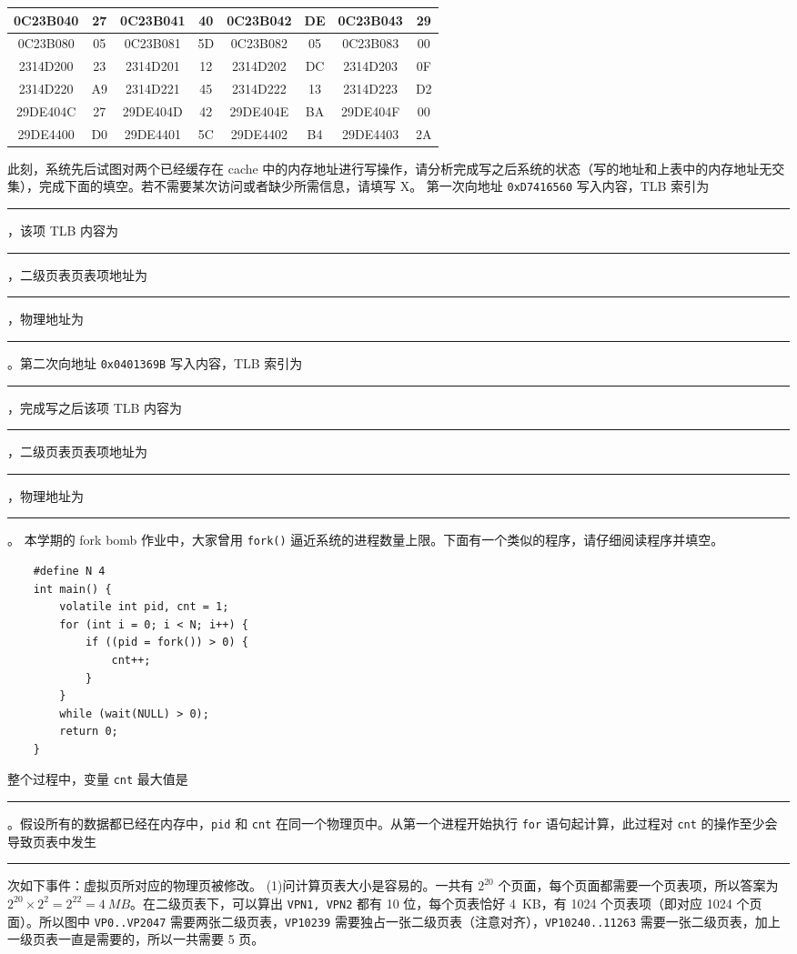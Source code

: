 \begin{problems}
\begin{table}[H]
\begin{tabular}{|c|c|c|c|c|c|c|c|}
                0C23B040 & 27 & 0C23B041 & 40 & 0C23B042 & DE & 0C23B043 & 29 \\ \hline
                0C23B080 & 05 & 0C23B081 & 5D & 0C23B082 & 05 & 0C23B083 & 00 \\ \hline
                2314D200 & 23 & 2314D201 & 12 & 2314D202 & DC & 2314D203 & 0F \\ \hline
                2314D220 & A9 & 2314D221 & 45 & 2314D222 & 13 & 2314D223 & D2 \\ \hline
                29DE404C & 27 & 29DE404D & 42 & 29DE404E & BA & 29DE404F & 00 \\ \hline
                29DE4400 & D0 & 29DE4401 & 5C & 29DE4402 & B4 & 29DE4403 & 2A \\ \hline
            \end{tabular}
        \end{table}
        此刻，系统先后试图对两个已经缓存在 cache 中的内存地址进行写操作，请分析完成写之后系统的状态（写的地址和上表中的内存地址无交集），完成下面的填空。若不需要某次访问或者缺少所需信息，请填写 X。
        第一次向地址 \verb|0xD7416560| 写入内容，TLB 索引为 \rule{2.5cm}{0.25mm}，该项 TLB 内容为 \rule{2.5cm}{0.25mm}，二级页表页表项地址为 \rule{2.5cm}{0.25mm}，物理地址为 \rule{2.5cm}{0.25mm}。第二次向地址 \verb|0x0401369B| 写入内容，TLB 索引为 \rule{2.5cm}{0.25mm}，完成写之后该项 TLB 内容为 \rule{2.5cm}{0.25mm}，二级页表页表项地址为 \rule{2.5cm}{0.25mm}，物理地址为 \rule{2.5cm}{0.25mm}。
        \qn 本学期的 fork bomb 作业中，大家曾用 \verb|fork()| 逼近系统的进程数量上限。下面有一个类似的程序，请仔细阅读程序并填空。
        \begin{verbatim}
    #define N 4
    int main() {
        volatile int pid, cnt = 1;
        for (int i = 0; i < N; i++) {
            if ((pid = fork()) > 0) {
                cnt++;
            }
        }
        while (wait(NULL) > 0);
        return 0;
    }
        \end{verbatim}
        整个过程中，变量 \verb|cnt| 最大值是 \rule{2.5cm}{0.25mm}。假设所有的数据都已经在内存中，\verb|pid| 和 \verb|cnt| 在同一个物理页中。从第一个进程开始执行 \verb|for| 语句起计算，此过程对 \verb|cnt| 的操作至少会导致页表中发生 \rule{2.5cm}{0.25mm} 次如下事件：虚拟页所对应的物理页被修改。
        \sol (1)问计算页表大小是容易的。一共有 $2^{20}$ 个页面，每个页面都需要一个页表项，所以答案为 $2^{20} \times 2^2=2^{22} = \SI{4}{MB}$。在二级页表下，可以算出 \verb|VPN1, VPN2| 都有 10 位，每个页表恰好 \SI{4}{KB}，有 1024 个页表项（即对应 1024 个页面）。所以图中 \verb|VP0..VP2047| 需要两张二级页表，\verb|VP10239| 需要独占一张二级页表（注意对齐），\verb|VP10240..11263| 需要一张二级页表，加上一级页表一直是需要的，所以一共需要 5 页。


\end{problems}
